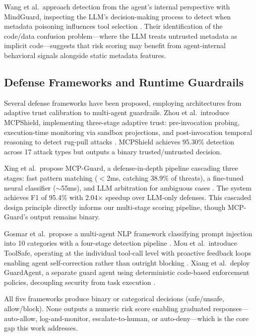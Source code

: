 \documentclass[12pt]{article}
\begin{document}
Wang et al.\ approach detection from the agent’s internal perspective with MindGuard, inspecting the LLM’s decision-making process to detect when metadata poisoning influences tool selection \cite{wang2026mindguard}. Their identification of the code/data confusion problem---where the LLM treats untrusted metadata as implicit code---suggests that risk scoring may benefit from agent-internal behavioral signals alongside static metadata features.

\subsection{Defense Frameworks and Runtime Guardrails}

Several defense frameworks have been proposed, employing architectures from adaptive trust calibration to multi-agent guardrails. Zhou et al.\ introduce MCPShield, implementing three-stage adaptive trust: pre-invocation probing, execution-time monitoring via sandbox projections, and post-invocation temporal reasoning to detect rug-pull attacks \cite{zhou2026mcpshield}. MCPShield achieves 95.30\% detection across 17 attack types but outputs a binary trusted/untrusted decision.

Xing et al.\ propose MCP-Guard, a defense-in-depth pipeline cascading three stages: fast pattern matching ($<$2ms, catching 38.9\% of threats), a fine-tuned neural classifier ($\sim$55ms), and LLM arbitration for ambiguous cases \cite{xing2026mcp_guard}. The system achieves F1 of 95.4\% with 2.04$\times$ speedup over LLM-only defenses. This cascaded design principle directly informs our multi-stage scoring pipeline, though MCP-Guard’s output remains binary.

Gosmar et al.\ propose a multi-agent NLP framework classifying prompt injection into 10 categories with a four-stage detection pipeline \cite{gosmar2025prompt_injection}. Mou et al.\ introduce ToolSafe, operating at the individual tool-call level with proactive feedback loops enabling agent self-correction rather than outright blocking \cite{mou2026toolsafe}. Xiang et al.\ deploy GuardAgent, a separate guard agent using deterministic code-based enforcement policies, decoupling security from task execution \cite{xiang2025guardagent}.

All five frameworks produce binary or categorical decisions (safe/unsafe, allow/block). None outputs a numeric risk score enabling graduated responses---auto-allow, log-and-monitor, escalate-to-human, or auto-deny---which is the core gap this work addresses.
\end{document}
